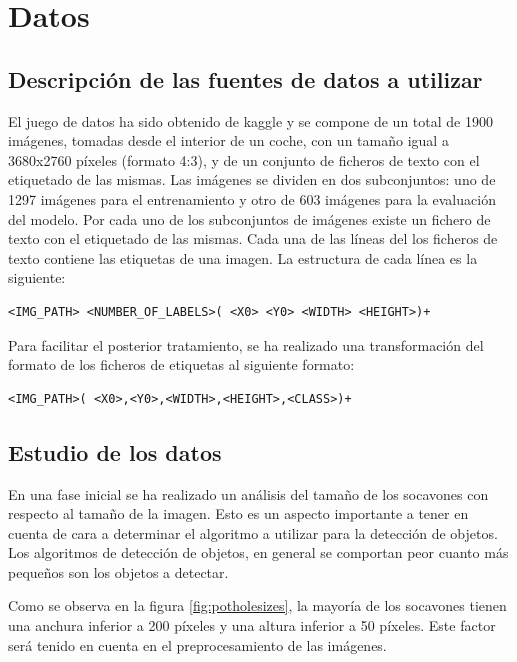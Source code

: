 \section{Datos}

\subsection{Descripción de las fuentes de datos a utilizar}

El juego de datos ha sido obtenido de kaggle \cite{potholedataset} y se compone de un total de 1900 imágenes, tomadas desde el interior de un coche, con un tamaño igual a 3680x2760 píxeles (formato 4:3), y de un conjunto de ficheros de texto con el etiquetado de las mismas. Las imágenes se dividen en dos subconjuntos: uno de 1297 imágenes para el entrenamiento y otro de 603 imágenes para la evaluación del modelo. Por cada uno de los subconjuntos de imágenes existe un fichero de texto con el etiquetado de las mismas. Cada una de las líneas del los ficheros de texto contiene las etiquetas de una imagen. La estructura de cada línea es la siguiente:

\begin{lstlisting}[frame=single,basicstyle=\ttfamily\footnotesize]
<IMG_PATH> <NUMBER_OF_LABELS>( <X0> <Y0> <WIDTH> <HEIGHT>)+
\end{lstlisting}

Para facilitar el posterior tratamiento, se ha realizado una transformación del formato de los ficheros de etiquetas al siguiente formato:

\begin{lstlisting}[frame=single,basicstyle=\ttfamily\footnotesize]
<IMG_PATH>( <X0>,<Y0>,<WIDTH>,<HEIGHT>,<CLASS>)+
\end{lstlisting}

\subsection{Estudio de los datos}

En una fase inicial se ha realizado un análisis del tamaño de los socavones con respecto al tamaño de la imagen. Esto es un aspecto importante a tener en cuenta de cara a determinar el algoritmo a utilizar para la detección de objetos. Los algoritmos de detección de objetos, en general se comportan peor cuanto más pequeños son los objetos a detectar.

Como se observa en la figura \ref{fig:potholesizes}, la mayoría de los socavones tienen una anchura inferior a 200 píxeles y una altura inferior a 50 píxeles. Este factor será tenido en cuenta en el preprocesamiento de las imágenes.

